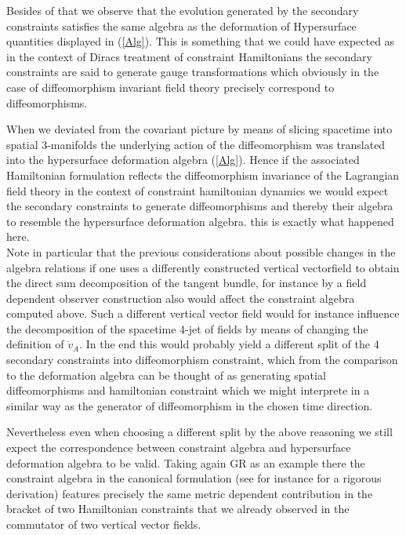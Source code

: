 \documentclass[a4paper,12pt, DIV=14, BCOR=5mm, twoside, headsepline]{scrbook}
\begin{document}
Besides of that we observe that the evolution generated by the secondary constraints satisfies the same algebra as the deformation of Hypersurface quantities displayed in (\ref{Alg}). This is something that we could have expected as in the context of Diracs treatment of constraint Hamiltonians the secondary constraints are said to generate gauge transformations which obviously in the case of diffeomorphism invariant field theory precisely correspond to diffeomorphisms. 

When we deviated from the covariant picture by means of slicing spacetime into spatial 3-manifolds the underlying action of the diffeomorphism was translated into the hypersurface deformation algebra (\ref{Alg}).
Hence if the associated Hamiltonian formulation reflects the diffeomorphism invariance of the Lagrangian field theory in the context of constraint hamiltonian dynamics we would expect the secondary constraints to generate diffeomorphisms and thereby their algebra to resemble the hypersurface deformation algebra. this is exactly what happened here.\\

Note in particular that the previous considerations about possible changes in the algebra relations if one uses a differently constructed vertical vectorfield to obtain the direct sum decomposition of the tangent bundle, for instance by a field dependent observer construction also would affect the constraint algebra computed above. Such a different vertical vector field would for instance influence the decomposition of the spacetime 4-jet of fields by means of changing the definition of $\dot{v}_A$. In the end this would probably yield a different split of the 4 secondary constraints into diffeomorphism constraint, which from the comparison to the deformation algebra can be thought of as generating spatial diffeomorphisms and hamiltonian constraint which we might interprete in a similar way as the generator of diffeomorphism in the chosen time direction. 

Nevertheless even when choosing a different split by the above reasoning we still expect the correspondence between constraint algebra and hypersurface deformation algebra to be valid. Taking again GR as an example there the constraint algebra in the canonical formulation (see for instance \cite{thiemann_2007} for a rigorous derivation) features precisely the same metric dependent contribution in the bracket of two Hamiltonian constraints that we already observed in the commutator of two vertical vector fields. \\
\end{document}
